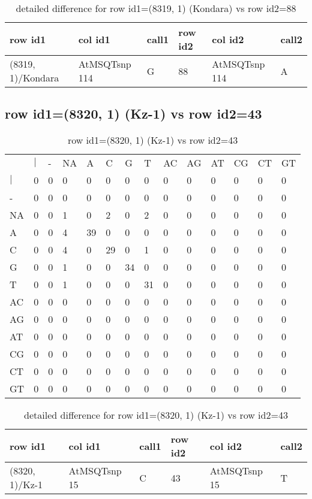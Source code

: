 \begin{center}
\begin{longtable}{|l|l|l|l|l|l|}
\caption{detailed difference for row id1=(8319, 1) (Kondara) vs row id2=88} \label{table_dm507}\\
\hline
row id1&col id1&call1&row id2&col id2&call2\\
\hline
(8319, 1)/Kondara&AtMSQTsnp 114&G&88&AtMSQTsnp 114&A\\
\hline
\end{longtable}
\end{center}

\subsection{row id1=(8320, 1) (Kz-1) vs row id2=43}
\begin{center}
\begin{longtable}{|l|l|l|l|l|l|l|l|l|l|l|l|l|l|}
\caption{row id1=(8320, 1) (Kz-1) vs row id2=43} \label{table_dm508}\\
\hline
\\
\hline
&$|$&-&NA&A&C&G&T&AC&AG&AT&CG&CT&GT\\
$|$&0&0&0&0&0&0&0&0&0&0&0&0&0\\
-&0&0&0&0&0&0&0&0&0&0&0&0&0\\
NA&0&0&1&0&2&0&2&0&0&0&0&0&0\\
A&0&0&4&39&0&0&0&0&0&0&0&0&0\\
C&0&0&4&0&29&0&1&0&0&0&0&0&0\\
G&0&0&1&0&0&34&0&0&0&0&0&0&0\\
T&0&0&1&0&0&0&31&0&0&0&0&0&0\\
AC&0&0&0&0&0&0&0&0&0&0&0&0&0\\
AG&0&0&0&0&0&0&0&0&0&0&0&0&0\\
AT&0&0&0&0&0&0&0&0&0&0&0&0&0\\
CG&0&0&0&0&0&0&0&0&0&0&0&0&0\\
CT&0&0&0&0&0&0&0&0&0&0&0&0&0\\
GT&0&0&0&0&0&0&0&0&0&0&0&0&0\\
\hline
\end{longtable}
\end{center}

\begin{center}
\begin{longtable}{|l|l|l|l|l|l|}
\caption{detailed difference for row id1=(8320, 1) (Kz-1) vs row id2=43} \label{table_dm509}\\
\hline
row id1&col id1&call1&row id2&col id2&call2\\
\hline
(8320, 1)/Kz-1&AtMSQTsnp 15&C&43&AtMSQTsnp 15&T\\
\hline
\end{longtable}
\end{center}

